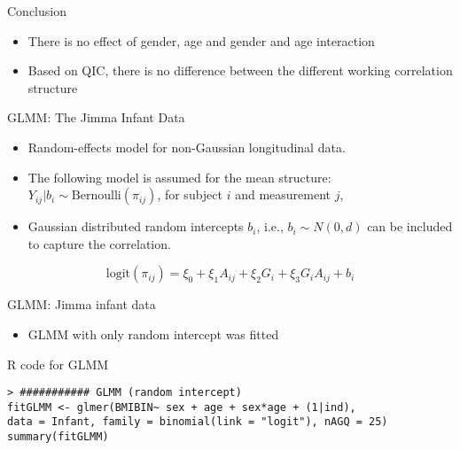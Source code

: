 \documentclass{beamer}
\begin{document}
\begin{frame}{Conclusion}
\begin{itemize}
	\item There is no effect of gender, age and gender and age interaction \vspace{0.5cm}
	\item Based on QIC, there is no difference between the different working correlation structure
\end{itemize}
\end{frame}

\begin{frame}{GLMM: The Jimma Infant Data}
\begin{itemize}\itemsep=0.2cm
	\item Random-effects model for non-Gaussian longitudinal data.
	\item The following model is assumed for the mean structure: $Y_{ij} | b_i  \sim  \mbox{Bernoulli}(\pi_{ij})$, for subject $i$ and measurement $j$,
	\item Gaussian distributed random intercepts $b_i$, i.e., $b_i \sim N(0,d)$ can be included to capture the correlation.
\end{itemize}
$$
\mbox{logit}(\pi_{ij})  =  \xi_0  +  \xi_1 A_{ij} + \xi_2 G_i + \xi_3 G_i A_{ij} +   b_i $$
\end{frame}

\begin{frame}[fragile] {GLMM: Jimma infant data}
\begin{itemize}
	\item GLMM with only random intercept was fitted
\end{itemize}
{\color{red} R code for GLMM}
\scriptsize\begin{verbatim}
> ########### GLMM (random intercept)
fitGLMM <- glmer(BMIBIN~ sex + age + sex*age + (1|ind), 
data = Infant, family = binomial(link = "logit"), nAGQ = 25)
summary(fitGLMM)
\end{verbatim}
\end{frame}
\end{document}
